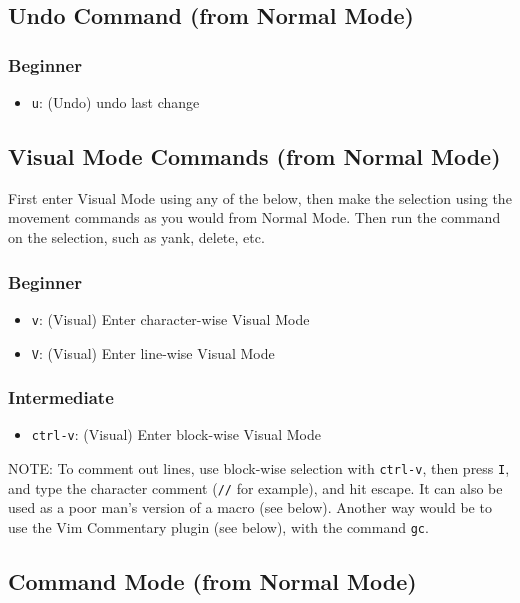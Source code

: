 \documentclass[11pt]{article}
\begin{document}
\subsection{Undo Command (from Normal Mode)}
\label{sec:org9b8c67a}
\subsubsection{Beginner}
\label{sec:org59f4443}
\begin{itemize}
\item \texttt{u}: (Undo) undo last change
\end{itemize}
\subsection{Visual Mode Commands (from Normal Mode)}
\label{sec:orgf25a0af}
First enter Visual Mode using any of the below, then make the selection using
the movement commands as you would from Normal Mode. Then run the command on the
selection, such as yank, delete, etc.
\subsubsection{Beginner}
\label{sec:orgd364171}
\begin{itemize}
\item \texttt{v}: (Visual) Enter character-wise Visual Mode
\item \texttt{V}: (Visual) Enter line-wise Visual Mode
\end{itemize}
\subsubsection{Intermediate}
\label{sec:orge41c5c8}
\begin{itemize}
\item \texttt{ctrl-v}: (Visual) Enter block-wise Visual Mode
\end{itemize}

NOTE: To comment out lines, use block-wise selection with \texttt{ctrl-v}, then press
\texttt{I}, and type the character comment (\texttt{//} for example), and hit escape. It can
also be used as a poor man's version of a macro (see below). Another way would
be to use the Vim Commentary plugin (see below), with the command \texttt{gc}.
\subsection{Command Mode (from Normal Mode)}
\label{sec:org486f673}
\end{document}
